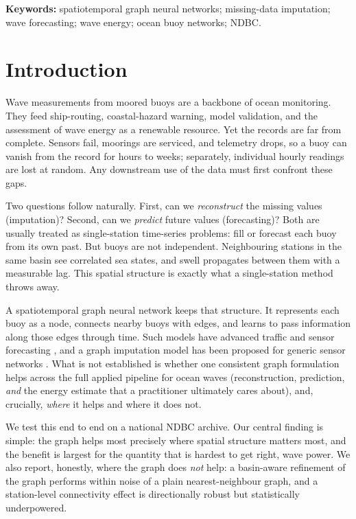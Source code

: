 \documentclass[11pt]{article}
\begin{document}
\noindent\textbf{Keywords:} spatiotemporal graph neural networks; missing-data
imputation; wave forecasting; wave energy; ocean buoy networks; NDBC.

\section{Introduction}
\label{sec:intro}
Wave measurements from moored buoys are a backbone of ocean monitoring. They
feed ship-routing, coastal-hazard warning, model validation, and the assessment
of wave energy as a renewable resource. Yet the records are far from complete.
Sensors fail, moorings are serviced, and telemetry drops, so a buoy can vanish
from the record for hours to weeks; separately, individual hourly readings are
lost at random. Any downstream use of the data must first confront these gaps.

Two questions follow naturally. First, can we \emph{reconstruct} the missing
values (imputation)? Second, can we \emph{predict} future values (forecasting)?
Both are usually treated as single-station time-series problems: fill or forecast
each buoy from its own past. But buoys are not independent. Neighbouring
stations in the same basin see correlated sea states, and swell propagates
between them with a measurable lag. This spatial structure is exactly what a
single-station method throws away.

A spatiotemporal graph neural network keeps that structure. It represents each
buoy as a node, connects nearby buoys with edges, and learns to pass information
along those edges through time. Such models have advanced traffic and sensor
forecasting \citep{dcrnn,gwn}, and a graph imputation model has been proposed
for generic sensor networks \citep{grin}. What is not established is whether one
consistent graph formulation helps across the full applied pipeline for ocean
waves (reconstruction, prediction, \emph{and} the energy estimate that a
practitioner ultimately cares about), and, crucially, \emph{where} it helps and
where it does not.

We test this end to end on a national NDBC archive. Our central finding is
simple: the graph helps most precisely where spatial structure matters most, and
the benefit is largest for the quantity that is hardest to get right, wave
power. We also report, honestly, where the graph does \emph{not} help: a
basin-aware refinement of the graph performs within noise of a plain
nearest-neighbour graph, and a station-level connectivity effect is directionally
robust but statistically underpowered.
\end{document}
